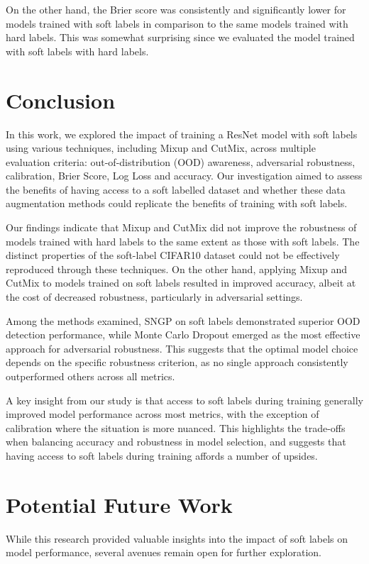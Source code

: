 \documentclass{article}
\begin{document}
On the other hand, the Brier score was consistently and significantly lower for models trained with soft labels in comparison to the same models trained with hard labels. This was somewhat surprising since we evaluated the model trained with soft labels with hard labels. 
\section{Conclusion}
In this work, we explored the impact of training a ResNet model with soft labels using various techniques, including Mixup and CutMix, across multiple evaluation criteria: out-of-distribution (OOD) awareness, adversarial robustness, calibration, Brier Score, Log Loss and accuracy. Our investigation aimed to assess the benefits of having access to a soft labelled dataset and whether these data augmentation methods could replicate the benefits of training with soft labels.

Our findings indicate that Mixup and CutMix did not improve the robustness of models trained with hard labels to the same extent as those with soft labels. The distinct properties of the soft-label CIFAR10 dataset could not be effectively reproduced through these techniques. On the other hand, applying Mixup and CutMix to models trained on soft labels resulted in improved accuracy, albeit at the cost of decreased robustness, particularly in adversarial settings.

Among the methods examined, SNGP on soft labels demonstrated superior OOD detection performance, while Monte Carlo Dropout emerged as the most effective approach for adversarial robustness. This suggests that the optimal model choice depends on the specific robustness criterion, as no single approach consistently outperformed others across all metrics.

A key insight from our study is that access to soft labels during training generally improved model performance across most metrics, with the exception of calibration where the situation is more nuanced. This highlights the trade-offs when balancing accuracy and robustness in model selection, and suggests that having access to soft labels during training affords a number of upsides. 

\section{Potential Future Work}
While this research provided valuable insights into the impact of soft labels on model performance, several avenues remain open for further exploration.
\end{document}
